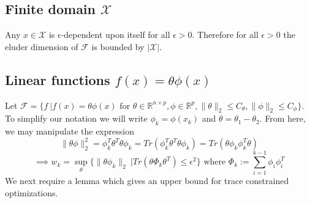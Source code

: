 \documentclass{article}
\newcommand{\Real}{\mathds{R}}
\newcommand{\Xc}{\mathcal{X}}
\newcommand{\Fc}{\mathcal{F}}
\begin{document}
\subsection{Finite domain $\Xc$}
Any $x \in \Xc$ is $\epsilon$-dependent upon itself for all $\epsilon>0$.
Therefore for all $\epsilon>0$ the eluder dimension of $\Fc$ is bounded by $|\Xc|$.

\subsection{Linear functions $f(x) = \theta \phi(x)$}
Let $\mathcal{F} = \{ f \ | f(x) = \theta \phi(x)  \text{ for } \theta \in \Real^{n \times p}, \phi \in \Real^p ,
\|\theta \|_2 \le C_\theta , \|\phi\|_2 \le C_\phi \}$.
To simplify our notation we will write $\phi_k = \phi(x_k)$ and $\theta = \theta_1 - \theta_2$.
From here, we may manipulate the expression
$$ \|\theta \phi \|_2^2 = \phi_k^T \theta^T\theta \phi_k = Tr(\phi_k^T \theta^T\theta \phi_k) = Tr(\theta \phi_k \phi_k^T \theta)$$
$$ \implies w_k = \sup_{\theta} \{ \|\theta \phi_k \|_2 \ \big| Tr(\theta \Phi_k \theta^T) \le \epsilon^2 \}
	\text{ where } \Phi_k := \sum_{i=1}^{k-1} \phi_i \phi_i^T $$
We next require a lemma which gives an upper bound for trace constrained optimizations.
\end{document}

